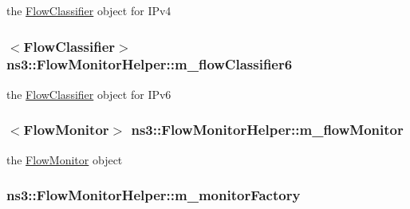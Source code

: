 the \hyperlink{classns3_1_1FlowClassifier}{Flow\+Classifier} object for I\+Pv4 

\subsubsection[{\texorpdfstring{m\+\_\+flow\+Classifier6}{m_flowClassifier6}}]{$<${\bf Flow\+Classifier}$>$ ns3\+::\+Flow\+Monitor\+Helper\+::m\+\_\+flow\+Classifier6\hspace{0.3cm}{\ttfamily [private]}}\hypertarget{classns3_1_1FlowMonitorHelper_a03b1e507ed0dc764b55e80c5ae2147b7}{}\label{classns3_1_1FlowMonitorHelper_a03b1e507ed0dc764b55e80c5ae2147b7}


the \hyperlink{classns3_1_1FlowClassifier}{Flow\+Classifier} object for I\+Pv6 

\subsubsection[{\texorpdfstring{m\+\_\+flow\+Monitor}{m_flowMonitor}}]{$<${\bf Flow\+Monitor}$>$ ns3\+::\+Flow\+Monitor\+Helper\+::m\+\_\+flow\+Monitor\hspace{0.3cm}{\ttfamily [private]}}\hypertarget{classns3_1_1FlowMonitorHelper_adabd8f957790154f8b40da80833c1954}{}\label{classns3_1_1FlowMonitorHelper_adabd8f957790154f8b40da80833c1954}


the \hyperlink{classns3_1_1FlowMonitor}{Flow\+Monitor} object 

\subsubsection[{\texorpdfstring{m\+\_\+monitor\+Factory}{m_monitorFactory}}]{ ns3\+::\+Flow\+Monitor\+Helper\+::m\+\_\+monitor\+Factory\hspace{0.3cm}{\ttfamily [private]}}\hypertarget{classns3_1_1FlowMonitorHelper_acfb30f8ccb4ec81de183b7dbaa4265fe}{}\label{classns3_1_1FlowMonitorHelper_acfb30f8ccb4ec81de183b7dbaa4265fe}


